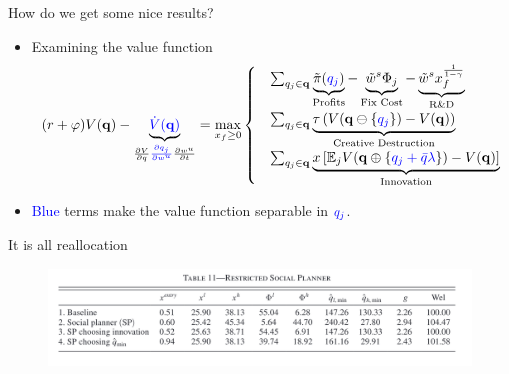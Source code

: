 \documentclass[usenames,dvipsnames,aspectratio=169]{beamer}
\begin{document}
\begin{frame}{How do we get some nice results?}
\begin{itemize}[label=\textcolor{teal}{$\blacktriangleright$}]
\item Examining the value function
\begin{align*}
(r+\varphi)V(\mathbf{q}) - \underbrace{\textcolor{blue}{\dot{V}(\mathbf{q})}}_{\frac{\partial V}{\partial q}\textcolor{blue}{\frac{\partial q_j}{\partial w^u}}\frac{\partial w^u}{\partial t}} = \max_{x_f\geq 0 }\begin{cases}
 &\sum_{q_j\in\mathbf{q}}\underbrace{\tilde{\pi}(\textcolor{blue}{q_j})}_{\text{Profits}} - \underbrace{\tilde{w}^s\Phi_j}_{\text{Fix Cost}} - \underbrace{\tilde{w}^s x_f^{\frac{1}{1-\gamma}}}_{\text{R\&D}}  \\
&\sum_{q_j\in\mathbf{q}} \underbrace{\tau\left(V(\mathbf{q}\ominus\{\textcolor{blue}{q_j}\} ) - V(\mathbf{q})\right) }_{\text{Creative Destruction}} \\ 
&\sum_{q_j\in\mathbf{q}} \underbrace{x\left[\mathbb{E}_jV(\mathbf{q}\oplus\{\textcolor{blue}{q_j+\textcolor{blue}{\bar{q}\lambda}} \})-V(\mathbf{q}) \right]}_{\text{Innovation}} 
\end{cases}
\end{align*}
 \item \textcolor{blue}{Blue} terms make the value function separable in $\textcolor{blue}{q_j}$. 

\end{itemize}

\end{frame}

\begin{frame}{It is all reallocation}
\begin{figure}[h]
\includegraphics[width=\textwidth]{Figures/week3fig1.png}
\end{figure}
\end{frame}
\end{document}
